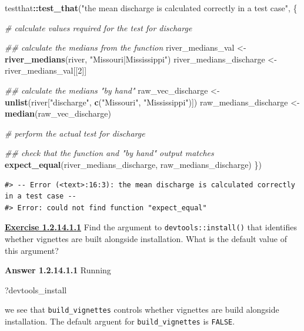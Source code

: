 \documentclass[
]{book}
\newenvironment{Shaded}{\begin{snugshade}}{\end{snugshade}}
\newcommand{\CommentTok}[1]{\textcolor[rgb]{0.56,0.35,0.01}{\textit{#1}}}
\newcommand{\DecValTok}[1]{\textcolor[rgb]{0.00,0.00,0.81}{#1}}
\newcommand{\KeywordTok}[1]{\textcolor[rgb]{0.13,0.29,0.53}{\textbf{#1}}}
\newcommand{\NormalTok}[1]{#1}
\newcommand{\OperatorTok}[1]{\textcolor[rgb]{0.81,0.36,0.00}{\textbf{#1}}}
\newcommand{\StringTok}[1]{\textcolor[rgb]{0.31,0.60,0.02}{#1}}
\begin{document}
\begin{Shaded}
\begin{Highlighting}[]
\NormalTok{testthat}\OperatorTok{::}\KeywordTok{test_that}\NormalTok{(}\StringTok{"the mean discharge is calculated correctly in a test case"}\NormalTok{, \{}
  
  \CommentTok{# calculate values required for the test for discharge}

  \CommentTok{## calculate the medians from the function}
\NormalTok{  river_medians_val <-}\StringTok{ }\KeywordTok{river_medians}\NormalTok{(river, }\StringTok{"Missouri|Mississippi"}\NormalTok{)}
\NormalTok{  river_medians_discharge <-}\StringTok{ }\NormalTok{river_medians_val[[}\DecValTok{2}\NormalTok{]]}

  \CommentTok{## calculate the medians "by hand"}
\NormalTok{  raw_vec_discharge <-}\StringTok{ }\KeywordTok{unlist}\NormalTok{(river[}\StringTok{"discharge"}\NormalTok{, }\KeywordTok{c}\NormalTok{(}\StringTok{"Missouri"}\NormalTok{, }\StringTok{"Mississippi"}\NormalTok{)])}
\NormalTok{  raw_medians_discharge <-}\StringTok{ }\KeywordTok{median}\NormalTok{(raw_vec_discharge)}
  
  \CommentTok{# perform the actual test for discharge}

  \CommentTok{## check that the function and "by hand" output matches}
  \KeywordTok{expect_equal}\NormalTok{(river_medians_discharge, raw_medians_discharge)}
\NormalTok{\})}
\end{Highlighting}
\end{Shaded}

\begin{verbatim}
#> -- Error (<text>:16:3): the mean discharge is calculated correctly in a test case --
#> Error: could not find function "expect_equal"
\end{verbatim}

\textbf{\protect\hyperlink{ex-set5}{Exercise 1.2.14.1.1}}
Find the argument to \texttt{devtools::install()} that identifies whether vignettes are built alongside installation. What is the default value of this argument?

\textbf{Answer 1.2.14.1.1} Running

\begin{Shaded}
\begin{Highlighting}[]
\NormalTok{?devtools_install}
\end{Highlighting}
\end{Shaded}

we see that \texttt{build\_vignettes} controls whether vignettes are build alongside installation. The default arguent for \texttt{build\_vignettes} is \texttt{FALSE}.
\end{document}
